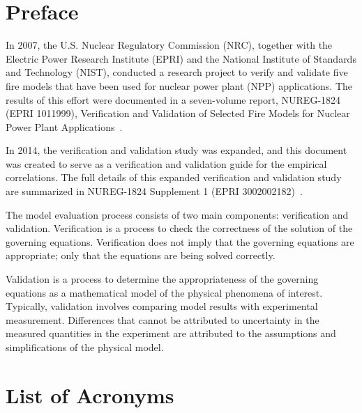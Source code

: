 \documentclass[11pt]{book}
\begin{document}
\pagestyle{plain}

\chapter{Preface}

In 2007, the U.S. Nuclear Regulatory Commission (NRC), together with the Electric Power Research Institute (EPRI) and the National Institute of Standards and Technology (NIST), conducted a research project to verify and validate five fire models that have been used for nuclear power plant (NPP) applications. The results of this effort were documented in a seven-volume report, NUREG-1824 (EPRI 1011999), Verification and Validation of Selected Fire Models for Nuclear Power Plant Applications~\cite{NUREG_1824}.

In 2014, the verification and validation study was expanded, and this document was created to serve as a verification and validation guide for the empirical correlations. The full details of this expanded verification and validation study are summarized in NUREG-1824 Supplement 1 (EPRI 3002002182)~\cite{NUREG_1824_Sup_1}.

The model evaluation process consists of two main components: verification and validation. Verification is a process to check the correctness of the solution of the governing equations. Verification does not imply that the governing equations are appropriate; only that the equations are being solved correctly.

Validation is a process to determine the appropriateness of the governing equations as a mathematical model of the physical phenomena of interest. Typically, validation involves comparing model results with experimental measurement. Differences that cannot be attributed to uncertainty in the measured quantities in the experiment are attributed to the assumptions and simplifications of the physical model.



\cleardoublepage
{}
{}
\tableofcontents

\cleardoublepage
{}
{}
\listoffigures

\cleardoublepage
{}
{}
\listoftables

\chapter{List of Acronyms}
\end{document}

